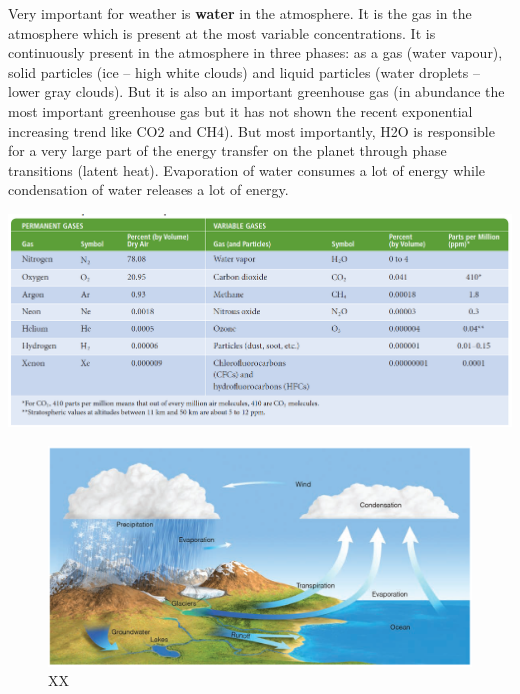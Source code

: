 \documentclass[12pt,oneside]{book}
\begin{document}
Very important for weather is \textbf{water} in the atmosphere. It is
the gas in the atmosphere which is present at the most variable
concentrations. It is continuously present in the atmosphere in three
phases: as a gas (water vapour), solid particles (ice -- high white
clouds) and liquid particles (water droplets -- lower gray clouds). But
it is also an important greenhouse gas (in abundance the most important
greenhouse gas but it has not shown the recent exponential increasing
trend like CO2 and CH4). But most importantly, H2O is responsible for a
very large part of the energy transfer on the planet through phase
transitions (latent heat). Evaporation of water consumes a lot of energy
while condensation of water releases a lot of energy.

\pagebreak

\begin{center}
\label{table:example}

\begin{center}\includegraphics[width=0.8\linewidth]{figures/Table11} \end{center}
\end{center}

\begin{figure}

{\centering \includegraphics[width=0.8\linewidth]{figures/Figure11} 

}

\caption{XX}\label{fig:intro}
\end{figure}
\end{document}
